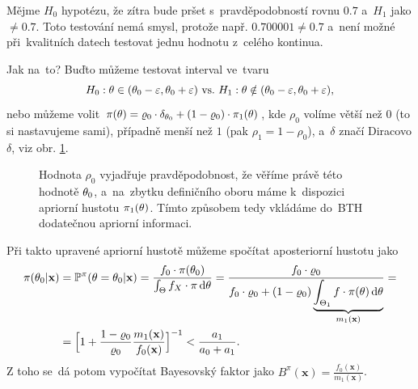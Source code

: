 \begin{example}
	Mějme $H_0$ hypotézu, že zítra bude pršet s~pravděpodobností rovnu $0.7$ a~$H_1$ jako $\neq 0.7$. Toto testování nemá smysl, protože např. $0.700001\neq 0.7$ a~není možné při~kvalitních datech testovat jednu hodnotu z~celého kontinua.
	
	Jak na~to? Buďto můžeme testovat interval ve~tvaru $$H_0: \theta\in(\theta_0-\varepsilon,\theta_0+\varepsilon) ~\text{vs.}~ H_1: \theta\notin(\theta_0-\varepsilon,\theta_0+\varepsilon),$$
	nebo můžeme volit $\pi(\theta)=\varrho_0\cdot \delta_{\theta_0}+(1-\varrho_0)\cdot\pi_1(\theta)$, kde $\rho_0$ volíme větší než $0$ (to si nastavujeme sami), případně menší než $1$ (pak $\rho_1=1-\rho_0$), a~$\delta$ značí Diracovo $\delta$, viz obr. \ref{fig:last1}.
	
	\begin{figure}[h]
		\centering
		
		\caption{Hodnota $\rho_0$ vyjadřuje pravděpodobnost, že věříme právě této hodnotě $\theta_0$, a~na~zbytku definičního oboru máme k~dispozici apriorní hustotu $\pi_1(\theta)$. Tímto způsobem tedy vkládáme do~BTH dodatečnou apriorní informaci.}
		\label{fig:last1}
	\end{figure}
	Při takto upravené apriorní hustotě můžeme spočítat aposteriorní hustotu jako
	\begin{align*}
	\pi(\theta_0|\textbf{x})&=\mathbb{P}^\pi(\theta=\theta_0|\textbf{x})=\frac{f_0\cdot\pi(\theta_0)}{\int_\Theta f_X \cdot \pi\,\mathrm{d}\theta}=\frac{f_0\cdot\varrho_0}{f_0\cdot\varrho_0+(1-\varrho_0)\underbrace{\int_{\Theta_1}f\cdot\pi(\theta)\,\mathrm{d}\theta}_{m_1(\textbf{x})}}= \\ 
	&=\Big[1+\frac{1-\varrho_0}{\varrho_0}\frac{m_1(\textbf{x})}{f_0(\textbf{x})}\Big]^{-1}<\frac{a_1}{a_0+a_1}.
	\end{align*}
	Z toho se~dá potom vypočítat Bayesovský faktor jako $B^\pi(\textbf{x})=\frac{f_0(\textbf{x})}{m_1(\textbf{x})}$.
\end{example}
